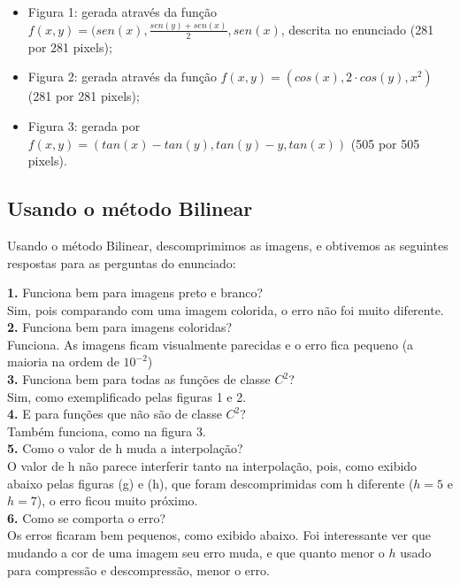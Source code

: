 \documentclass[12pt,letterpaper]{article}
\begin{document}
	\begin{itemize}
		\item Figura 1: gerada através da função
		$f(x,y) = (sen(x), \frac{sen(y)+sen(x)}{2}, sen(x)$, descrita no enunciado (281 por 281 pixels);
		\item Figura 2: gerada através da função $f(x,y) = (cos(x), 2\cdot cos(y), x^2)$ (281 por 281 pixels);
		\item Figura 3: gerada por $f(x,y) = (tan(x) - tan(y), tan(y)- y, tan(x))$ (505 por 505 pixels).
	\end{itemize}
	
	\clearpage
	
	\subsection{Usando o método Bilinear}
	
	Usando o método Bilinear, descomprimimos as imagens, e obtivemos as seguintes respostas para as perguntas do enunciado:
	
	\textbf{1.} Funciona bem para imagens preto e branco?\\
	Sim, pois comparando com uma imagem colorida, o erro não foi muito diferente.\\
	
	\textbf{2.} Funciona bem para imagens coloridas?\\
	Funciona. As imagens ficam visualmente parecidas e o erro fica pequeno (a maioria na ordem de $10^{-2}$)\\
	
	\textbf{3.} Funciona bem para todas as funções de classe $C^2$?\\
	Sim, como exemplificado pelas figuras 1 e 2.\\
	
	\textbf{4.} E para funções que não são de classe $C^2$? \\
	Também funciona, como na figura 3.\\
	
	\textbf{5.} Como o valor de h muda a interpolação? \\
	O valor de h não parece interferir tanto na interpolação, pois, como exibido abaixo pelas figuras (g) e (h), que foram descomprimidas com h diferente ($h = 5$ e $h = 7$), o erro ficou muito próximo.\\
	
	\textbf{6.} Como se comporta o erro?\\
	Os erros ficaram bem pequenos, como exibido abaixo. Foi interessante ver que mudando a cor de uma imagem seu erro muda, e que quanto menor o $h$ usado para compressão e descompressão, menor o erro. \\
	
\end{document}
